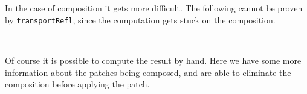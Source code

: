 \begin{code}%
%
\>[2]\AgdaFunction{\AgdaUnderscore{}}\AgdaSpace{}%
\AgdaSymbol{:}\AgdaSpace{}%
\AgdaSpace{}%
\AgdaSpace{}%
\AgdaSpace{}%
\AgdaSpace{}%
\<%
\\
%
\>[2]\AgdaSymbol{\AgdaUnderscore{}}\AgdaSpace{}%
\AgdaSymbol{=}\AgdaSpace{}%
\AgdaSpace{}%
\<%
\\
%
\\[\AgdaEmptyExtraSkip]%
%
\>[2]\AgdaFunction{\AgdaUnderscore{}}\AgdaSpace{}%
\AgdaSymbol{:}\AgdaSpace{}%
\AgdaSpace{}%
\AgdaSpace{}%
\AgdaSpace{}%
\AgdaSpace{}%
\AgdaSpace{}%
\AgdaSpace{}%
\AgdaSpace{}%
\AgdaSpace{}%
\AgdaInductiveConstructor{[]}\<%
\\
%
\>[2]\AgdaSymbol{\AgdaUnderscore{}}\AgdaSpace{}%
\AgdaSymbol{=}\AgdaSpace{}%
\AgdaSpace{}%
\AgdaSymbol{\AgdaUnderscore{}}\<%
\end{code}
In the case of composition it gets more difficult. The following cannot be proven by
\texttt{transportRefl}, since the computation gets stuck on the composition.
\begin{code}%
%
\>[2]\AgdaFunction{\AgdaUnderscore{}}\AgdaSpace{}%
\AgdaSymbol{:}\AgdaSpace{}%
\AgdaSpace{}%
\AgdaSpace{}%
\AgdaSpace{}%
\AgdaSpace{}%
\AgdaSpace{}%
\AgdaSpace{}%
\AgdaSpace{}%
\AgdaSpace{}%
\AgdaInductiveConstructor{[]}\<%
\\
%
\>[2]\AgdaSymbol{\AgdaUnderscore{}}\AgdaSpace{}%
\AgdaSymbol{=}\AgdaSpace{}%
\AgdaHole{\{!!\}}\<%
\end{code}
Of course it is possible to compute the result by hand. Here we have some more information
about the patches being composed, and are able to eliminate the composition before applying the patch.
